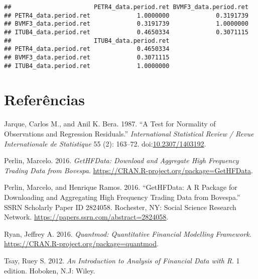 \documentclass[]{article}
\begin{document}
\begin{verbatim}
##                       PETR4_data.period.ret BVMF3_data.period.ret
## PETR4_data.period.ret             1.0000000             0.3191739
## BVMF3_data.period.ret             0.3191739             1.0000000
## ITUB4_data.period.ret             0.4650334             0.3071115
##                       ITUB4_data.period.ret
## PETR4_data.period.ret             0.4650334
## BVMF3_data.period.ret             0.3071115
## ITUB4_data.period.ret             1.0000000
\end{verbatim}

\pagebreak

\section*{Referências}\label{referencias}

\setlength{\parindent}{0in}

\hypertarget{refs}{}
\hypertarget{ref-jarqueux5ftestux5f1987}{}
Jarque, Carlos M., and Anil K. Bera. 1987. ``A Test for Normality of
Observations and Regression Residuals.'' \emph{International Statistical
Review / Revue Internationale de Statistique} 55 (2): 163--72.
doi:\href{https://doi.org/10.2307/1403192}{10.2307/1403192}.

\hypertarget{ref-perlinux5fgethfdata:ux5f2016}{}
Perlin, Marcelo. 2016. \emph{GetHFData: Download and Aggregate High
Frequency Trading Data from Bovespa}.
\url{https://CRAN.R-project.org/package=GetHFData}.

\hypertarget{ref-perlinux5fgethfdata:ux5f2016-1}{}
Perlin, Marcelo, and Henrique Ramos. 2016. ``GetHFData: A R Package for
Downloading and Aggregating High Frequency Trading Data from Bovespa.''
SSRN Scholarly Paper ID 2824058. Rochester, NY: Social Science Research
Network. \url{https://papers.ssrn.com/abstract=2824058}.

\hypertarget{ref-ryanux5fquantmod:ux5f2016}{}
Ryan, Jeffrey A. 2016. \emph{Quantmod: Quantitative Financial Modelling
Framework}. \url{https://CRAN.R-project.org/package=quantmod}.

\hypertarget{ref-tsayux5fintroductionux5f2012}{}
Tsay, Ruey S. 2012. \emph{An Introduction to Analysis of Financial Data
with R}. 1 edition. Hoboken, N.J: Wiley.
\end{document}
